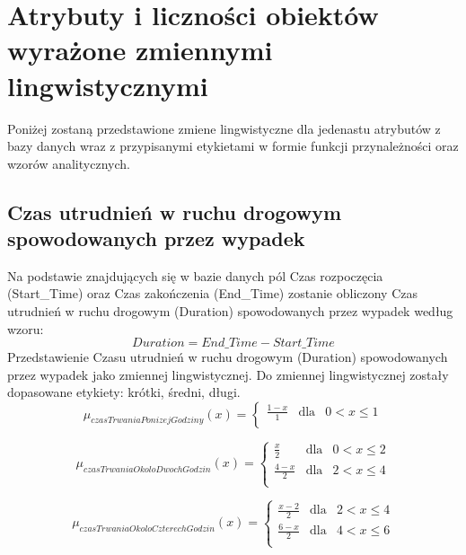 \documentclass{classrep}
\begin{document}
\section{Atrybuty i liczności obiektów wyrażone zmiennymi lingwistycznymi}

Poniżej zostaną przedstawione zmiene lingwistyczne\cite{niewiadomskiRozmyte} dla jedenastu atrybutów z bazy danych wraz z przypisanymi etykietami w formie funkcji przynależności oraz wzorów analitycznych. \\

\subsection{Czas utrudnień w ruchu drogowym spowodowanych przez wypadek}
Na podstawie znajdujących się w bazie danych pól Czas rozpoczęcia (Start\_Time) oraz Czas zakończenia (End\_Time) zostanie obliczony Czas utrudnień w ruchu drogowym (Duration) spowodowanych przez wypadek według wzoru:
\begin{equation}
Duration = End\_Time - Start\_Time
\end{equation}
Przedstawienie Czasu utrudnień w ruchu drogowym (Duration) spowodowanych przez wypadek jako zmiennej lingwistycznej. Do zmiennej lingwistycznej zostały dopasowane etykiety: krótki, średni, długi. 
\begin{equation}
\mu _{czasTrwaniaPonizejGodziny}(x) =  \left\{ \begin{array}{rcl}
\frac{1 - x}{1} & \mbox{dla} & 0 < x \leq 1\\
\end{array}\right.
\end{equation}

\begin{equation}
\mu _{czasTrwaniaOkoloDwochGodzin}(x) =  \left\{ \begin{array}{rcl}
\frac{x}{2} & \mbox{dla} & 0 < x \leq 2\\
\frac{4 - x}{2} & \mbox{dla} & 2 < x \leq 4\\
\end{array}\right.
\end{equation}

\begin{equation}
\mu _{czasTrwaniaOkoloCzterechGodzin}(x) =  \left\{ \begin{array}{rcl}
\frac{x - 2}{2} & \mbox{dla} & 2 < x \leq 4\\
\frac{6 - x}{2} & \mbox{dla} & 4 < x \leq 6\\
\end{array}\right.
\end{equation}
\end{document}
